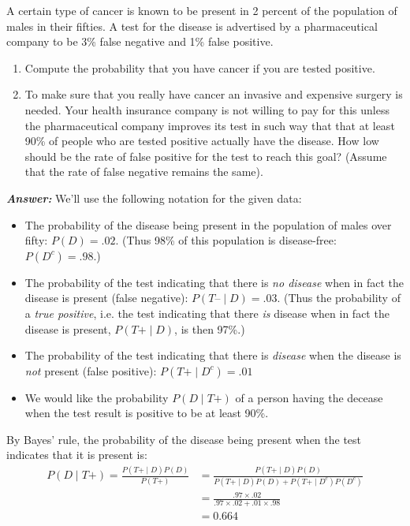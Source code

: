 \documentclass[12pt]{article}
\newenvironment{question}[2][Question]{\begin{trivlist}
\item[\hskip \labelsep {\bfseries #1}\hskip \labelsep {\bfseries #2.}]}{\end{trivlist}}
\begin{document}
\bigskip
\bigskip
\begin{question}{2.2} A certain type of cancer is known to be present in 2 percent of the population of males in their fifties.
A test for the disease is advertised by a pharmaceutical company to be 3\% false negative and 1\% false positive.
\begin{enumerate}
\item{ Compute the probability that you have cancer if you are tested positive.}
\item{To make sure that you really have cancer an invasive and expensive surgery is needed. Your health insurance company is not willing to pay for this unless the pharmaceutical company improves its test in such way that that at least 90\% of people who are tested positive actually have the disease. How low should be the rate of false positive for the test to reach this goal? (Assume that the rate of false negative remains the same).}
\end{enumerate}

\end{question}

 \textbf{\color{TealBlue}\emph{Answer:} } 
 We'll use the following notation for the given data:
 \begin{itemize}
   \item The probability of the disease being present in the population of males over fifty: $P(D) = .02$. (Thus 98\% of this population is disease-free: $P(D^c) = .98$.)
  \item The probability of the test indicating that there is \emph{no disease} when in fact the disease is present (false negative): $P(T\text{--} \mid  D) = .03$. (Thus the probability of a \emph{true positive}, i.e. the test indicating that there \emph{is} disease when in fact the disease is present, $P(T\text{+} \mid  D)$, is then 97\%.)
  \item The probability of the test indicating that there is \emph{disease} when the disease is \emph{not} present (false positive): $P(T\text{+} \mid  D^c) = .01$
  \item We would like the probability $P(D \mid  T\text{+})$ of a person having the decease when the test result is positive to be at least 90\%. 
\end{itemize}

By Bayes' rule, the probability of the disease being present when the test indicates that it is present is:
 \begin{align*}
P(D \mid T\text{+}) = \frac{P(T\text{+} \mid  D) P(D) } {P(T\text{+} )} 
&= \frac{P(T\text{+} \mid  D) P(D) } {P(T\text{+} \mid  D) P(D) + P(T\text{+} \mid  D^c) P(D^c) } \\
&= \frac{.97 \times .02 } {.97 \times .02 + .01 \times .98} \\
&= 0.664
\end{align*}
\end{document}

